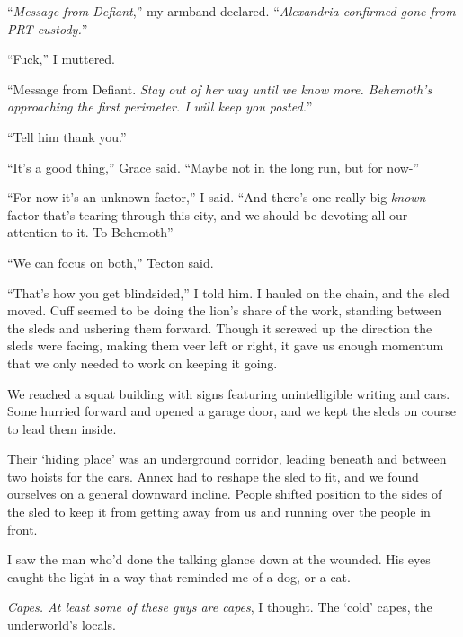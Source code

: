 ``\emph{Message from Defiant},'' my armband declared.  ``\emph{Alexandria confirmed gone from PRT custody.}''



``Fuck,'' I muttered.



``Message from Defiant.  \emph{Stay out of her way until we know more.  Behemoth's approaching the first perimeter.  I will keep you posted.}''



``Tell him thank you.''



``It's a good thing,'' Grace said.  ``Maybe not in the long run, but for now-''



``For now it's an unknown factor,'' I said.  ``And there's one really big \emph{known} factor that's tearing through this city, and we should be devoting all our attention to it.  To Behemoth''



``We can focus on both,'' Tecton said.



``That's how you get blindsided,'' I told him.  I hauled on the chain, and the sled moved.  Cuff seemed to be doing the lion's share of the work, standing between the sleds and ushering them forward.  Though it screwed up the direction the sleds were facing, making them veer left or right, it gave us enough momentum that we only needed to work on keeping it going.



We reached a squat building with signs featuring unintelligible writing and cars.  Some hurried forward and opened a garage door, and we kept the sleds on course to lead them inside.



Their `hiding place' was an underground corridor, leading beneath and between two hoists for the cars.  Annex had to reshape the sled to fit, and we found ourselves on a general downward incline.  People shifted position to the sides of the sled to keep it from getting away from us and running over the people in front.



I saw the man who'd done the talking glance down at the wounded.  His eyes caught the light in a way that reminded me of a dog, or a cat.



\emph{Capes.  At least some of these guys are capes}, I thought.  The `cold' capes, the underworld's locals.



